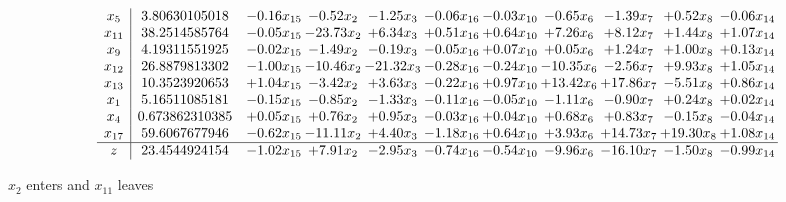 \documentclass[9pt]{article}
\begin{document}
 \[\begin{array}{c| c c@{\hskip 2pt} c@{\hskip 2pt} c@{\hskip 2pt} c@{\hskip 2pt} c@{\hskip 2pt} c@{\hskip 2pt} c@{\hskip 2pt} c@{\hskip 2pt} c@{\hskip 2pt} }
 x_{5}   &  3.80630105018 & -0.16 x_{15} & -0.52 x_{2} & -1.25 x_{3} & -0.06 x_{16} & -0.03 x_{10} & -0.65 x_{6} & -1.39 x_{7} & +  0.52 x_{8} & -0.06 x_{14}\\
 x_{11}   &  38.2514585764 & -0.05 x_{15} & -23.73 x_{2} & +  6.34 x_{3} & +  0.51 x_{16} & +  0.64 x_{10} & +  7.26 x_{6} & +  8.12 x_{7} & +  1.44 x_{8} & +  1.07 x_{14}\\
 x_{9}   &  4.19311551925 & -0.02 x_{15} & -1.49 x_{2} & -0.19 x_{3} & -0.05 x_{16} & +  0.07 x_{10} & +  0.05 x_{6} & +  1.24 x_{7} & +  1.00 x_{8} & +  0.13 x_{14}\\
 x_{12}   &  26.8879813302 & -1.00 x_{15} & -10.46 x_{2} & -21.32 x_{3} & -0.28 x_{16} & -0.24 x_{10} & -10.35 x_{6} & -2.56 x_{7} & +  9.93 x_{8} & +  1.05 x_{14}\\
 x_{13}   &  10.3523920653 & +  1.04 x_{15} & -3.42 x_{2} & +  3.63 x_{3} & -0.22 x_{16} & +  0.97 x_{10} & + 13.42 x_{6} & + 17.86 x_{7} & -5.51 x_{8} & +  0.86 x_{14}\\
 x_{1}   &  5.16511085181 & -0.15 x_{15} & -0.85 x_{2} & -1.33 x_{3} & -0.11 x_{16} & -0.05 x_{10} & -1.11 x_{6} & -0.90 x_{7} & +  0.24 x_{8} & +  0.02 x_{14}\\
 x_{4}   &  0.673862310385 & +  0.05 x_{15} & +  0.76 x_{2} & +  0.95 x_{3} & -0.03 x_{16} & +  0.04 x_{10} & +  0.68 x_{6} & +  0.83 x_{7} & -0.15 x_{8} & -0.04 x_{14}\\
 x_{17}   &  59.6067677946 & -0.62 x_{15} & -11.11 x_{2} & +  4.40 x_{3} & -1.18 x_{16} & +  0.64 x_{10} & +  3.93 x_{6} & + 14.73 x_{7} & + 19.30 x_{8} & +  1.08 x_{14}\\
\hline
z    &  23.4544924154 & -1.02 x_{15} & +  7.91 x_{2} & -2.95 x_{3} & -0.74 x_{16} & -0.54 x_{10} & -9.96 x_{6} & -16.10 x_{7} & -1.50 x_{8} & -0.99 x_{14}\\
\end{array}\]


 $ x_{2} $ enters and $ x_{11} $ leaves 
\end{document}
